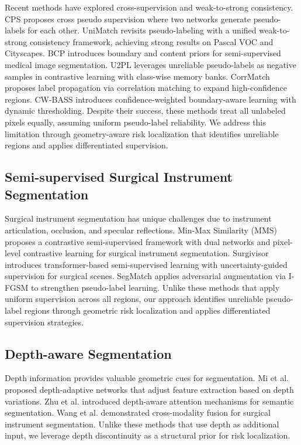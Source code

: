 \documentclass[conference]{IEEEtran}
\begin{document}
Recent methods have explored cross-supervision and weak-to-strong consistency. CPS \cite{chen2021cps} proposes cross pseudo supervision where two networks generate pseudo-labels for each other. UniMatch \cite{yang2023unimatch} revisits pseudo-labeling with a unified weak-to-strong consistency framework, achieving strong results on Pascal VOC and Cityscapes. BCP \cite{bai2023bcp} introduces boundary and content priors for semi-supervised medical image segmentation. U2PL \cite{wang2022u2pl} leverages unreliable pseudo-labels as negative samples in contrastive learning with class-wise memory banks. CorrMatch \cite{sun2024corrmatch} proposes label propagation via correlation matching to expand high-confidence regions. CW-BASS \cite{cwbass2025} introduces confidence-weighted boundary-aware learning with dynamic thresholding. Despite their success, these methods treat all unlabeled pixels equally, assuming uniform pseudo-label reliability. We address this limitation through geometry-aware risk localization that identifies unreliable regions and applies differentiated supervision.

\subsection{Semi-supervised Surgical Instrument Segmentation}
Surgical instrument segmentation has unique challenges due to instrument articulation, occlusion, and specular reflections. Min-Max Similarity (MMS) \cite{li2023minmax} proposes a contrastive semi-supervised framework with dual networks and pixel-level contrastive learning for surgical instrument segmentation. Surgivisor \cite{liu2024surgivisor} introduces transformer-based semi-supervised learning with uncertainty-guided supervision for surgical scenes. SegMatch \cite{segmatch2025} applies adversarial augmentation via I-FGSM to strengthen pseudo-label learning. Unlike these methods that apply uniform supervision across all regions, our approach identifies unreliable pseudo-label regions through geometric risk localization and applies differentiated supervision strategies.

\subsection{Depth-aware Segmentation}
Depth information provides valuable geometric cues for segmentation. Mi et al. \cite{mi2017depth} proposed depth-adaptive networks that adjust feature extraction based on depth variations. Zhu et al. \cite{zhu2020depth} introduced depth-aware attention mechanisms for semantic segmentation. Wang et al. \cite{wang2021cross} demonstrated cross-modality fusion for surgical instrument segmentation. Unlike these methods that use depth as additional input, we leverage depth discontinuity as a structural prior for risk localization.
\end{document}
